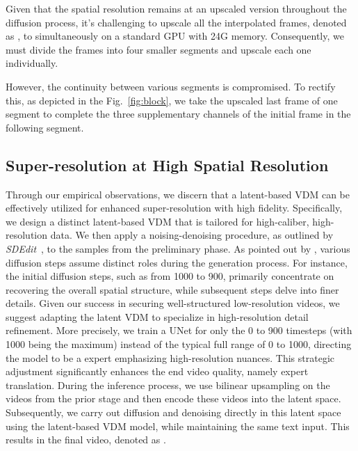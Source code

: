 \documentclass{article} \usepackage{iclr2024_conference,times}
\begin{document}
Given that the spatial resolution remains at an upscaled version throughout the diffusion process, it's challenging to upscale all the interpolated frames, denoted as , to  simultaneously on a standard GPU with  24G memory. Consequently, we must divide the frames into four smaller segments and upscale each one individually.  

However, the continuity between various segments is compromised. To rectify this, as depicted in the Fig.~\ref{fig:block}, we take the upscaled last frame of one segment to complete the three supplementary channels of the initial frame in the following segment.

\vspace{-3mm}

\subsection{Super-resolution at High Spatial Resolution}
\label{section3.6}

Through our empirical observations, we discern that a latent-based VDM can be effectively utilized for enhanced super-resolution with high fidelity. Specifically, we design a distinct latent-based VDM that is tailored for high-caliber, high-resolution data. We then apply a noising-denoising procedure, as outlined by \emph{SDEdit}~\citep{meng2021sdedit}, to the samples from the preliminary phase. As pointed out by \citep{balaji2022ediffi}, various diffusion steps assume distinct roles during the generation process. For instance, the initial diffusion steps, such as from 1000 to 900, primarily concentrate on recovering the overall spatial structure, while subsequent steps delve into finer details. Given our success in securing well-structured low-resolution videos, we suggest adapting the latent VDM to specialize in high-resolution detail refinement. More precisely, we train a UNet for only the 0 to 900 timesteps (with 1000 being the maximum) instead of the typical full range of 0 to 1000, directing the model to be a expert emphasizing high-resolution nuances. This strategic adjustment significantly enhances the end video quality, namely expert translation. 
During the inference process, we use bilinear upsampling on the videos from the prior stage and then encode these videos into the latent space. Subsequently, we carry out diffusion and denoising directly in this latent space using the latent-based VDM model, while maintaining the same text input. This results in the final video, denoted as 
  .  
  
\end{document}
